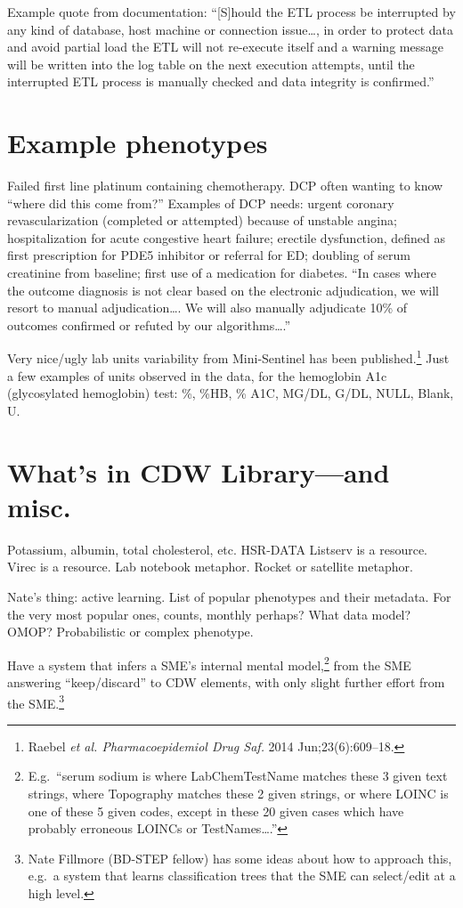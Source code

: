 \documentclass{tufte-handout}
\begin{document}
Example quote from documentation: ``[S]hould the ETL process be
interrupted by any kind of database, host machine or connection
issue\ldots{}, in order to protect data and avoid partial load the ETL
will not re-execute itself and a warning message will be written into
the log table on the next execution attempts, until the interrupted
ETL process is manually checked and data integrity is confirmed.''


\section{Example phenotypes}

Failed first line platinum containing chemotherapy. DCP often wanting
to know ``where did this come from?'' Examples of DCP needs: urgent
coronary revascularization (completed or attempted) because of
unstable angina; hospitalization for acute congestive heart failure;
erectile dysfunction, defined as first prescription for PDE5 inhibitor
or referral for ED; doubling of serum creatinine from baseline; first
use of a medication for diabetes. ``In cases where the outcome
diagnosis is not clear based on the electronic adjudication, we will
resort to manual adjudication\ldots{}. We will also manually adjudicate
10\% of outcomes confirmed or refuted by our algorithms\ldots{}.''

Very nice/ugly lab units variability from Mini-Sentinel has been
published.\footnote{Raebel \emph{et al. Pharmacoepidemiol Drug Saf.}
  2014 Jun;23(6):609--18.} Just a few examples of units observed in
the data, for the hemoglobin A1c (glycosylated hemoglobin) test: \%,
\%HB, \% A1C, MG/DL, G/DL, NULL, Blank, U.

\section{What's in CDW Library---and misc.}

Potassium, albumin, total cholesterol, etc. HSR-DATA Listserv is a
resource. Virec is a resource. Lab notebook metaphor. Rocket or
satellite metaphor.

Nate's thing: active learning. List of popular phenotypes and their
metadata. For the very most popular ones, counts, monthly perhaps?
What data model? OMOP? Probabilistic or complex phenotype.

Have a system that infers a SME's internal mental
model,\footnote{E.g.\ ``serum sodium is where LabChemTestName matches
  these 3 given text strings, where Topography matches these 2 given
  strings, or where LOINC is one of these 5 given codes, except in
  these 20 given cases which have probably erroneous LOINCs or
  TestNames\ldots{}.''} from the SME answering ``keep/discard'' to CDW
elements, with only slight further effort from the SME.\footnote{Nate
  Fillmore (BD-STEP fellow) has some ideas about how to approach this,
  e.g.\ a system that learns classification trees that the SME can
  select/edit at a high level.}
\end{document}
